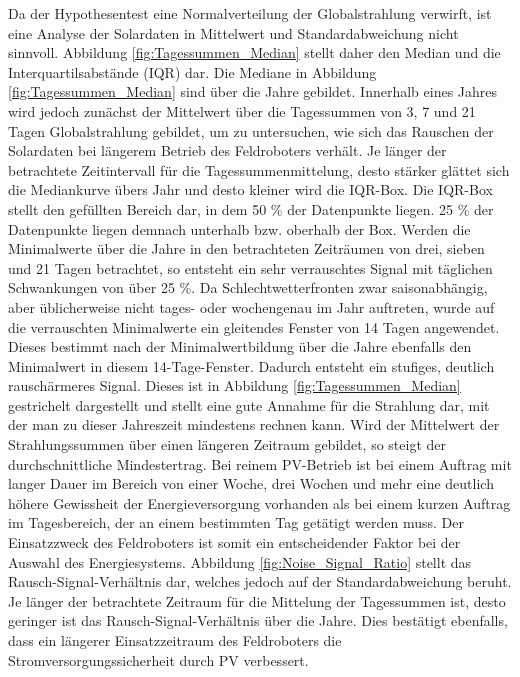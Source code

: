 Da der Hypothesentest eine Normalverteilung der Globalstrahlung verwirft, ist eine Analyse der Solardaten in Mittelwert und Standardabweichung nicht sinnvoll. Abbildung \ref{fig:Tagessummen_Median} stellt daher den Median und die Interquartilsabstände (IQR) dar. Die Mediane in Abbildung \ref{fig:Tagessummen_Median} sind über die Jahre gebildet. Innerhalb eines Jahres wird jedoch zunächst der Mittelwert über die Tagessummen von 3, 7 und 21 Tagen Globalstrahlung gebildet, um zu untersuchen, wie sich das Rauschen der Solardaten bei längerem Betrieb des Feldroboters verhält. Je länger der betrachtete Zeitintervall für die Tagessummenmittelung, desto stärker glättet sich die Mediankurve übers Jahr und desto kleiner wird die IQR-Box. Die IQR-Box stellt den gefüllten Bereich dar, in dem 50 \% der Datenpunkte liegen. 25 \% der Datenpunkte liegen demnach unterhalb bzw. oberhalb der Box. Werden die Minimalwerte über die Jahre in den betrachteten Zeiträumen von drei, sieben und 21 Tagen betrachtet, so entsteht ein sehr verrauschtes Signal mit täglichen Schwankungen von über 25 \%. Da Schlechtwetterfronten zwar saisonabhängig, aber üblicherweise nicht tages- oder wochengenau im Jahr auftreten, wurde auf die verrauschten Minimalwerte ein gleitendes Fenster von 14 Tagen angewendet. Dieses bestimmt nach der Minimalwertbildung über die Jahre ebenfalls den Minimalwert in diesem 14-Tage-Fenster. Dadurch entsteht ein stufiges, deutlich rauschärmeres Signal. Dieses ist in Abbildung \ref{fig:Tagessummen_Median} gestrichelt dargestellt und stellt eine gute Annahme für die Strahlung dar, mit der man zu dieser Jahreszeit mindestens rechnen kann. Wird der Mittelwert der Strahlungssummen über einen längeren Zeitraum gebildet, so steigt der durchschnittliche Mindestertrag. Bei reinem PV-Betrieb ist bei einem Auftrag mit langer Dauer im Bereich von einer Woche, drei Wochen und mehr eine deutlich höhere Gewissheit der Energieversorgung vorhanden als bei einem kurzen Auftrag im Tagesbereich, der an einem bestimmten Tag getätigt werden muss.
Der Einsatzzweck des Feldroboters ist somit ein entscheidender Faktor bei der Auswahl des Energiesystems. Abbildung \ref{fig:Noise_Signal_Ratio} stellt das Rausch-Signal-Verhältnis dar, welches jedoch auf der Standardabweichung beruht. Je länger der betrachtete Zeitraum für die Mittelung der Tagessummen ist, desto geringer ist das Rausch-Signal-Verhältnis über die Jahre. Dies bestätigt ebenfalls, dass ein längerer Einsatzzeitraum des Feldroboters die Stromversorgungssicherheit durch PV verbessert.


